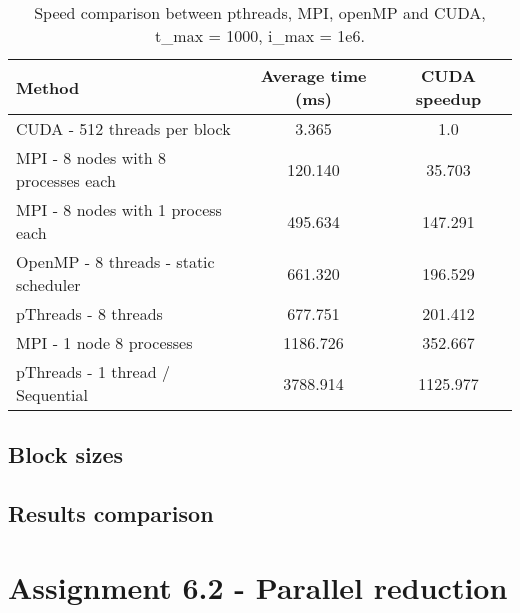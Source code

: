 \documentclass[a4paper]{article}
\begin{document}
		\begin{table}[H]
			\label{table:speed_comparison}
			\caption{Speed comparison between pthreads, MPI, openMP and CUDA, t\_max = 1000, i\_max = 1e6.}
			\begin{center}
				\begin{tabular}{| l | c | c |}
					\hline
					Method & Average time (ms) & CUDA speedup\\
					\hline
					CUDA - 512 threads per block & 3.365 & 1.0\\
					\hline
					MPI - 8 nodes with 8 processes each & 120.140 & 35.703\\
					\hline
					MPI - 8 nodes with 1 process each & 495.634 & 147.291\\
					\hline
					OpenMP - 8 threads - static scheduler & 661.320 & 196.529\\
					\hline
					pThreads - 8 threads & 677.751 & 201.412\\
					\hline
					MPI - 1 node 8 processes & 1186.726 & 352.667\\
					\hline
					pThreads - 1 thread / Sequential & 3788.914 & 1125.977\\
					\hline
				\end{tabular}
			\end{center}
		\end{table}
	
	
	
	\subsection{Block sizes}
	
	\subsection{Results comparison}
	
	

\section{Assignment 6.2 - Parallel reduction}
\end{document}
